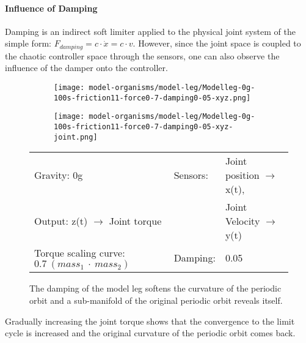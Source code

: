 \documentclass[main]{subfiles}
\begin{document}
\paragraph{Influence of Damping} Damping is an indirect soft limiter applied to the physical joint system of the simple form: \(F_{damping} = c \cdot \dot{x} = c \cdot v\). %
%
However, since the joint space is coupled to the chaotic controller space through the sensors, one can also observe the influence of the damper onto the controller.

\begin{figure}[H]
	\centering
		\begin{subfigure}[c]{0.45\textwidth}
	\texttt{[image: model-organisms/model-leg/Modelleg-0g-100s-friction11-force0-7-damping0-05-xyz.png]}
		\end{subfigure}
	\begin{subfigure}[c]{0.45\textwidth}
	\texttt{[image: model-organisms/model-leg/Modelleg-0g-100s-friction11-force0-7-damping0-05-xyz-joint.png]}
		\end{subfigure}
	\caption[Damped, limited chaotic controller controlling model leg]{The damping of the model leg softens the curvature of the periodic orbit and a sub-manifold of the original periodic orbit reveals itself.}
	\begin{tabular}{l|ll}
	\hline 
	Gravity: 0g  & Sensors: & Joint position \(\rightarrow\) x(t),\\
	 Output: z(t) \(\rightarrow\) Joint torque & & Joint Velocity \(\rightarrow\) y(t) \\
	  Torque scaling curve: \(0.7~(mass_1~\cdot~mass_2)\) & Damping: & 0.05 \\
	  \hline
	\end{tabular}

	\label{figure:limited-damped-model-leg-damping1}
\end{figure}

Gradually increasing the joint torque shows that the convergence to the limit cycle is increased and the original curvature of the periodic orbit comes back.
\end{document}
